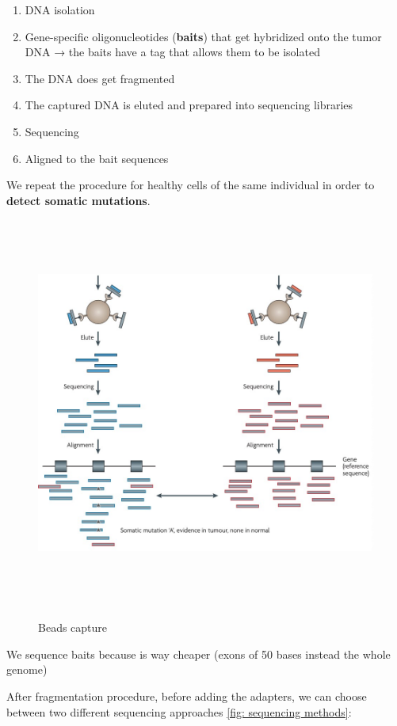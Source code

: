 \begin{enumerate}
\def\labelenumi{\arabic{enumi})}
\item
  DNA isolation
\item
  Gene-specific oligonucleotides (\textbf{baits}) that get hybridized onto the
  tumor DNA → the baits have a tag that allows them to be isolated
\item
  The DNA does get fragmented
\item
  The captured DNA is eluted and prepared into sequencing libraries
\item
  Sequencing
\item
  Aligned to the bait sequences
\end{enumerate}


We repeat the procedure for healthy cells of the same individual in order to
\textbf{detect somatic mutations}.

\begin{figure}[H]
  \includegraphics[width=6.14828in,height=5.07625in]{image10.jpeg} \label{fig:
  DNA cancer variants detection}
  \centering
  \caption{Beads capture}
\end{figure}


We sequence baits because is way cheaper (exons of 50 bases instead the whole
genome)

After fragmentation procedure, before adding the adapters, we can choose between
two different sequencing approaches \ref{fig: sequencing methods}:

